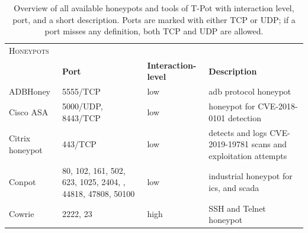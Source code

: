 \begin{table}
    \centering
    \caption[Overview of honeypots of T-Pot]{
        Overview of all available honeypots and tools of T-Pot with interaction level, port, and a short description.
        Ports are marked with either TCP or UDP; if a port misses any definition, both TCP and UDP are allowed.
    }
    \begin{tabularx}{\linewidth}{l|XlX}
        \toprule
        \textsc{Honeypots}                        & \multicolumn{3}{c}{}                                                                                                                                                                                                            \\
                                                  & \textbf{Port}                                                                                               & \textbf{Interaction-level} & \textbf{Description}                                                                 \\
        \hline
        ADBHoney \cite{adbhoney2021}              & 5555/TCP                                                                                                    & low                        & \ac{adb} protocol honeypot                                                           \\
        Cisco ASA \cite{cymmetria2018}            & 5000/UDP, 8443/TCP                                                                                          & low                        & honeypot for CVE-2018-0101\cite{CVE-2018-0101} detection                             \\
        Citrix honeypot \cite{citrixhoneypot2020} & 443/TCP                                                                                                     & low                        & detects and logs CVE-2019-19781\cite{CVE-2019-19781} scans and exploitation attempts \\
        Conpot \cite{conpot2021}                  & 80, 102, 161, 502, 623, 1025, 2404, \newline 10001, 44818, 47808, 50100                                     & low                        & industrial honeypot for \ac{ics}, and \ac{scada}                                     \\
        Cowrie \cite{cowrie2021}                  & 2222, 23                                                                                                    & high                       & SSH and Telnet honeypot                                                              \\

\end{tabularx}
\end{table}
